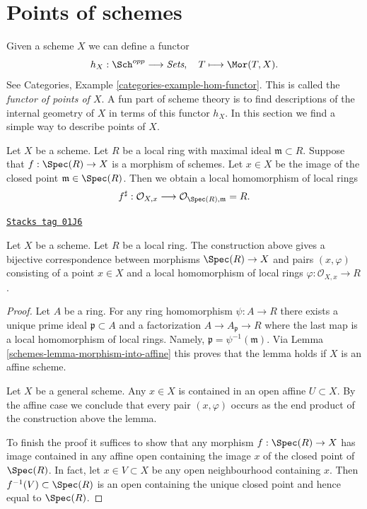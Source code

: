 \section{Points of schemes}
\label{schemes-section-points}
Given a scheme $X$ we can define a functor
$$
h_X : \Sch^{opp}
\longrightarrow
\textit{Sets}, \quad
T \longmapsto \Mor(T, X).
$$
See Categories, Example \ref{categories-example-hom-functor}.
This is called the {\it functor of points of $X$}.
A fun part of scheme theory is to find descriptions of
the internal geometry of $X$ in terms of this functor $h_X$.
In this section we find a simple way to describe
points of $X$.

\medskip\noindent
Let $X$ be a scheme. Let $R$ be a local ring with maximal ideal
$\mathfrak m \subset R$. Suppose that $f : \Spec(R) \to X$
is a morphism of schemes. Let $x \in X$ be the image of the closed point
$\mathfrak m \in \Spec(R)$. Then we obtain a local homomorphism
of local rings
$$
f^\sharp :
\mathcal{O}_{X, x}
\longrightarrow
\mathcal{O}_{\Spec(R), \mathfrak m} = R.
$$

\begin{lemma}
\label{schemes-lemma-morphism-from-spec-local-ring}
\href{https://stacks.math.columbia.edu/tag/01J6}{\texttt{Stacks tag 01J6}}

Let $X$ be a scheme. Let $R$ be a local ring.
The construction above gives a bijective correspondence
between morphisms $\Spec(R) \to X$ and pairs
$(x, \varphi)$ consisting of a point $x \in X$ and
a local homomorphism of local rings $\varphi : \mathcal{O}_{X, x} \to R$.
\end{lemma}

\begin{proof}

Let $A$ be a ring. For any ring homomorphism $\psi : A \to R$
there exists a unique prime ideal $\mathfrak p \subset A$
and a factorization $A \to A_{\mathfrak p} \to R$ where the
last map is a local homomorphism of local rings. Namely,
$\mathfrak p = \psi^{-1}(\mathfrak m)$. Via
Lemma \ref{schemes-lemma-morphism-into-affine}
this proves that the lemma holds if $X$ is an affine scheme.

\medskip\noindent
Let $X$ be a general scheme. Any $x \in X$ is contained in
an open affine $U \subset X$. By the affine case we conclude that every pair
$(x, \varphi)$ occurs as the end product of the construction
above the lemma.

\medskip\noindent
To finish the proof it suffices to show that any morphism
$f : \Spec(R) \to X$ has image contained in any affine
open containing the image $x$ of the closed
point of $\Spec(R)$. In fact, let $x \in V \subset X$
be any open neighbourhood containing $x$. Then
$f^{-1}(V) \subset \Spec(R)$ is an open containing
the unique closed point and hence equal to $\Spec(R)$.
\end{proof}

